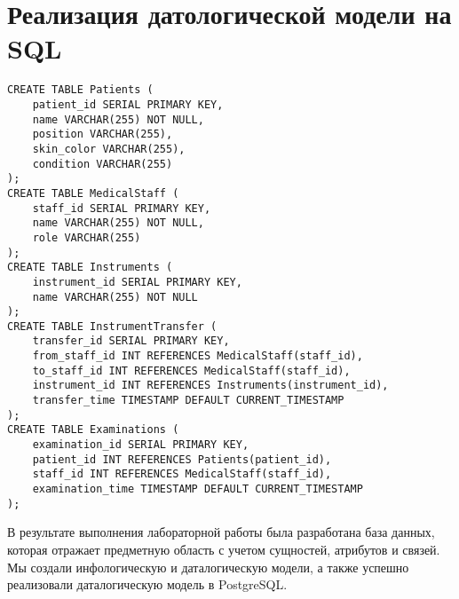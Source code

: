 \documentclass[14pt]{extreport}
\begin{document}
    \section{Реализация датологической модели на SQL}
    \begin{verbatim}
CREATE TABLE Patients (
    patient_id SERIAL PRIMARY KEY,
    name VARCHAR(255) NOT NULL,
    position VARCHAR(255),
    skin_color VARCHAR(255),
    condition VARCHAR(255)
);
CREATE TABLE MedicalStaff (
    staff_id SERIAL PRIMARY KEY,
    name VARCHAR(255) NOT NULL,
    role VARCHAR(255)
);
CREATE TABLE Instruments (
    instrument_id SERIAL PRIMARY KEY,
    name VARCHAR(255) NOT NULL
);
CREATE TABLE InstrumentTransfer (
    transfer_id SERIAL PRIMARY KEY,
    from_staff_id INT REFERENCES MedicalStaff(staff_id),
    to_staff_id INT REFERENCES MedicalStaff(staff_id),
    instrument_id INT REFERENCES Instruments(instrument_id),
    transfer_time TIMESTAMP DEFAULT CURRENT_TIMESTAMP
);
CREATE TABLE Examinations (
    examination_id SERIAL PRIMARY KEY,
    patient_id INT REFERENCES Patients(patient_id),
    staff_id INT REFERENCES MedicalStaff(staff_id),
    examination_time TIMESTAMP DEFAULT CURRENT_TIMESTAMP
);
    \end{verbatim}


    \conclusions В результате выполнения лабораторной работы была разработана база данных, которая отражает предметную область с учетом сущностей, атрибутов и связей. Мы создали инфологическую и даталогическую модели, а также успешно реализовали даталогическую модель в PostgreSQL.
\end{document}
